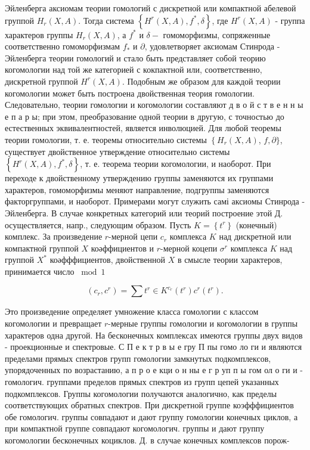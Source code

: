 \documentclass[10pt]{article}
\begin{document}
Эйленберга аксиомам теории гомологий с дискретной или компактной абелевой группой $H_{r}(X, A)$. Тогда система $\left\{H^{r}(X, A), f^{*}, \delta\right\}$, где $H^{r}(X, A)$ - группа характеров группы $H_{r}(X, A)$, а $f^{*}$ и $\delta-$ гомоморфизмы, сопряженные соответственно гомоморфизмам $f_{*}$ и $\partial$, удовлетворяет аксиомам Стинрода - Эйленберга теории гомологий и стало быть представляет собой теорию когомологии над той же категорией с кокпактной или, соответственно, дискретной группой $H^{r}(X, A)$. Подобным же образом для каждой теории когомологии может быть построена двойственная теория гомологии. Следовательно, теории гомологии и когомологии составляют д в о й с т в е н н ы е п а р ы; при этом, преобразование одной теории в другую, с точностью до естественных эквивалентностей, является инволюцией. Для любой теоремы теории гомологии, т. е. теоремы относительно системы $\left\{H_{r}(X, A)\right.$, $f, \partial\}$, существует двойственное утверждение относительно системы $\left\{H^{r}(X, A), f^{*}, \delta\right\}$, т. е. теорема теории когомологии, и наоборот. При переходе к двойственному утверждению группы заменяются их группами характеров, гомоморфизмы меняют направление, подгруппы заменяются факторгруппами, и наоборот. Примерами могут служить самі аксиомы Стинрода - Эйленберга. В случае конкретных категорий или теорий построение этой Д. осуществляется, напр., следующим образом. Пусть $K=\left\{t^{r}\right\}$ (конечный) комплекс. За произведение $r$-мерной цепи $c_{r}$ комплекса $K$ над дискретной или компактной группой $X$ коәффициентов и $r$-мерной коцепи $\sigma^{r}$ комплекса $K$ над группой $X^{*}$ коәфффициентов, двойственной $X$ в смысле теории характеров, принимается число $\bmod 1$



\[

\left(c_{r}, c^{r}\right)=\sum t^{r} \in K^{c_{r}}\left(t^{r}\right) c^{r}\left(t^{r}\right) .

\]



Это произведение определяет умножение класса гомологии с классом когомологии и превращает $r$-мерные группы гомологии и когомологии в группы характеров одна другой. На бесконечных комплексах имеются группы двух видов - проекционные и спектровые. С П е к т р в ы е гру П пы гомо ло ги и являются пределами прямых спектров групп гомологии замкнутых подкомплексов, упорядоченных по возрастанию, а п р о е кци о н ны е г р уп п ы гом ол о ги и - гомологич. группами пределов прямых спектров из групп цепей указанных подкомплексов. Группы когомологии получаются аналогично, как пределы соответствующих обратных спектров. При дискретной группе коэфффициентов обе гомологич. группы совпадают и дают группу гомологии конечных циклов, а при компактной группе совпадают когомологич. группы и дают группу когомологии бесконечных коциклов. Д. в случае конечных комплексов порож-
\end{document}
